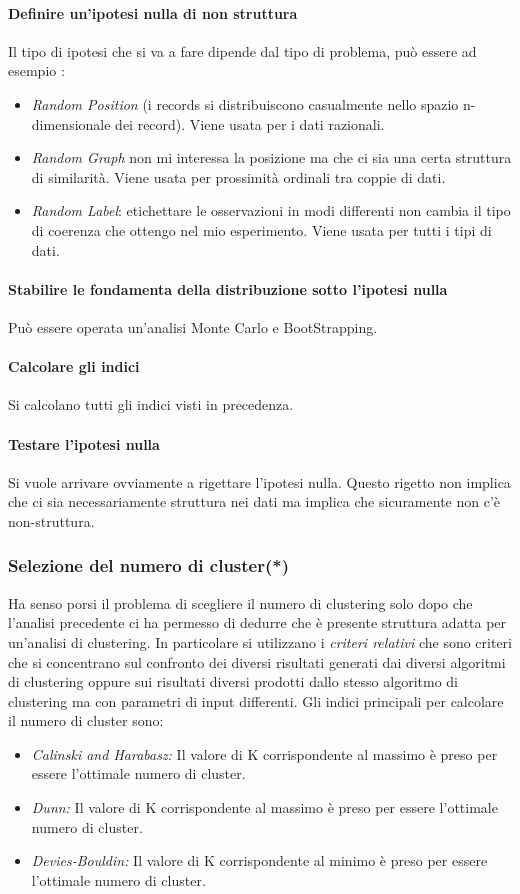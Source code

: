  \paragraph{Definire un'ipotesi nulla di non struttura} Il tipo di ipotesi che si va a fare dipende dal tipo di problema, può essere ad esempio :
 \begin{itemize}
 	\item \textit{Random Position} (i records si distribuiscono casualmente nello spazio n-dimensionale dei record). Viene usata per i dati razionali.
 	\item \textit{Random Graph } non mi interessa la posizione ma che ci sia una certa struttura di similarità. Viene usata per prossimità ordinali tra coppie di dati.
 	\item \textit{Random Label}: etichettare le osservazioni in modi differenti non cambia il tipo di coerenza che ottengo nel mio esperimento. Viene usata per tutti i tipi di dati.
 \end{itemize}
\paragraph{Stabilire le fondamenta della distribuzione sotto l'ipotesi nulla} Può essere operata un'analisi Monte Carlo e BootStrapping.
\paragraph{Calcolare gli indici} Si calcolano tutti gli indici visti in precedenza.
\paragraph{Testare l'ipotesi nulla} Si vuole arrivare ovviamente a rigettare l'ipotesi nulla. Questo rigetto non implica che ci sia necessariamente struttura nei dati ma implica che sicuramente non c'è non-struttura. 
 
 \subsubsection{Selezione del numero di cluster(*)}
 Ha senso porsi il problema di scegliere il numero di clustering solo dopo che l'analisi precedente ci ha permesso di dedurre che è presente struttura adatta per un'analisi di clustering. In particolare si utilizzano i \textit{criteri relativi} che sono criteri che si concentrano sul confronto dei diversi risultati generati dai diversi algoritmi di clustering oppure sui risultati diversi prodotti dallo stesso algoritmo di clustering ma con parametri di input differenti.
 Gli indici principali per calcolare il numero di cluster sono:
 \begin{itemize}
 	\item \textit{Calinski and Harabasz:} Il valore di K corrispondente al massimo è preso per essere l'ottimale numero di cluster.
 	\item \textit{Dunn:} Il valore di K corrispondente al massimo è preso per essere l'ottimale numero di cluster.
 	\item \textit{Devies-Bouldin:} Il valore di K corrispondente al minimo è preso per essere l'ottimale numero di cluster.
 \end{itemize}
 
